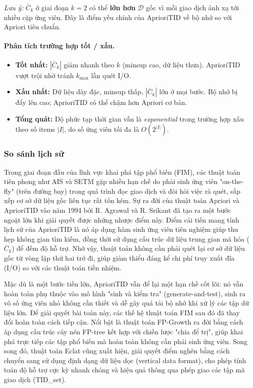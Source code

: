 \documentclass[12pt]{article}
\begin{document}
\noindent\textit{Lưu ý:} $\bar{C}_k$ ở giai đoạn $k = 2$ có thể \textbf{lớn hơn}
$\mathcal{D}$ gốc vì mỗi giao dịch ánh xạ tới nhiều cặp ứng viên.
Đây là điểm yếu chính của AprioriTID về bộ nhớ so với Apriori tiêu chuẩn.

\paragraph{Phân tích trường hợp tốt / xấu.}
\begin{itemize}
  \item \textbf{Tốt nhất:} $|\bar{C}_k|$ giảm nhanh theo $k$ (minsup cao, dữ liệu thưa).
        AprioriTID vượt trội nhờ tránh $k_{\max}$ lần quét I/O.
  \item \textbf{Xấu nhất:} Dữ liệu dày đặc, minsup thấp, $|\bar{C}_k|$ lớn ở mọi bước.
        Bộ nhớ bị đẩy lên cao; AprioriTID có thể chậm hơn Apriori cơ bản.
  \item \textbf{Tổng quát:} Độ phức tạp thời gian vẫn là \textit{exponential}
        trong trường hợp xấu theo số items $|I|$, do số ứng viên tối đa là $O(2^{|I|})$.
\end{itemize}

\subsubsection{So sánh lịch sử}
Trong giai đoạn đầu của lĩnh vực khai phá tập phổ biến (FIM), các thuật toán tiên phong như AIS và SETM gặp nhiều hạn chế do phải sinh ứng viên "on-the-fly" (trên đường bay) trong quá trình đọc giao dịch và đòi hỏi việc rà quét, sắp xếp cơ sở dữ liệu gốc liên tục rất tốn kém. Sự ra đời của thuật toán Apriori và AprioriTID vào năm 1994 bởi R. Agrawal và R. Srikant đã tạo ra một bước ngoặt lớn khi giải quyết được những nhược điểm này. Điểm cải tiến mang tính lịch sử của AprioriTID là nó áp dụng hàm sinh ứng viên tiên nghiệm giúp thu hẹp không gian tìm kiếm, đồng thời sử dụng cấu trúc dữ liệu trung gian mã hóa ($\overline{C}_k$) để đếm độ hỗ trợ. Nhờ vậy, thuật toán không cần phải quét lại cơ sở dữ liệu gốc từ vòng lặp thứ hai trở đi, giúp giảm thiểu đáng kể chi phí truy xuất đĩa (I/O) so với các thuật toán tiền nhiệm.

Mặc dù là một bước tiến lớn, AprioriTID vẫn để lại một hạn chế cốt lõi: nó vẫn hoàn toàn phụ thuộc vào mô hình "sinh và kiểm tra" (generate-and-test), sinh ra vô số ứng viên nhỏ không cần thiết và dễ gây quá tải bộ nhớ khi xử lý các tập dữ liệu lớn. Để giải quyết bài toán này, các thế hệ thuật toán FIM sau đó đã thay đổi hoàn toàn cách tiếp cận. Nổi bật là thuật toán FP-Growth ra đời bằng cách áp dụng cấu trúc cây nén FP-tree kết hợp với chiến lược "chia để trị", giúp khai phá trực tiếp các tập phổ biến mà hoàn toàn không cần phải sinh ứng viên. Song song đó, thuật toán Eclat cũng xuất hiện, giải quyết điểm nghẽn bằng cách chuyển sang sử dụng định dạng dữ liệu dọc (vertical data format), cho phép tính toán độ hỗ trợ cực kỳ nhanh chóng và hiệu quả thông qua phép giao các tập mã giao dịch (TID\_set).
\end{document}
